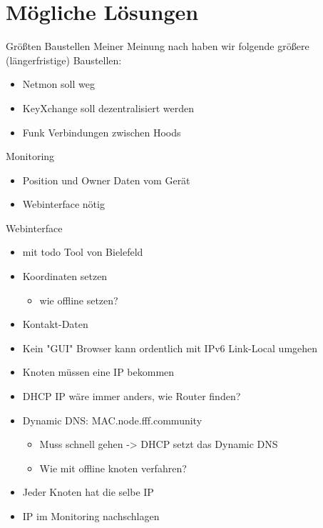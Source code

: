 \section{Mögliche Lösungen}

\begin{frame}{Größten Baustellen}
    Meiner Meinung nach haben wir folgende größere (längerfristige)
    Baustellen:
    \begin{itemize}
        \item Netmon soll weg
        \item KeyXchange soll dezentralisiert werden
        \item Funk Verbindungen zwischen Hoods
    \end{itemize}
\end{frame}

\begin{frame}{Monitoring}
    \begin{itemize}
        \item Position und Owner Daten vom Gerät
        \item Webinterface nötig
    \end{itemize}
\end{frame}

\begin{frame}{Webinterface}
    \begin{itemize}
        \item \zb{} mit todo Tool von Bielefeld
        \item Koordinaten setzen
            \begin{itemize}
                \item wie offline setzen?
            \end{itemize}
        \item Kontakt-Daten
        \item Kein "GUI" Browser kann ordentlich mit IPv6 Link-Local
            umgehen
        \item Knoten müssen eine IP bekommen
        \item DHCP IP wäre immer anders, wie Router finden?
        \item Dynamic DNS: MAC.node.fff.community
            \begin{itemize}
                \item Muss schnell gehen -> DHCP setzt das Dynamic DNS
                \item Wie mit offline knoten verfahren?
            \end{itemize}
        \item Jeder Knoten hat die selbe IP
        \item IP im Monitoring nachschlagen
    \end{itemize}
\end{frame}


